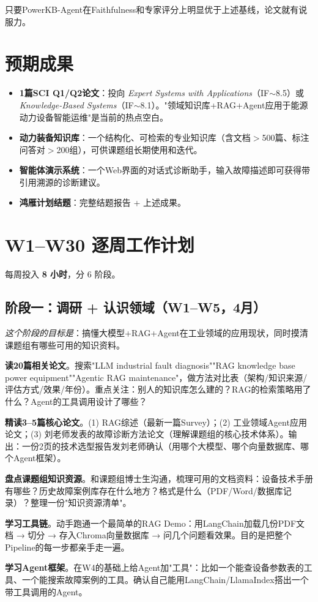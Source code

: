 \documentclass[a4paper, 11pt]{ctexart}
\begin{document}
只要PowerKB-Agent在Faithfulness和专家评分上明显优于上述基线，论文就有说服力。


\section{预期成果}
\begin{itemize}
    \item \textbf{1篇SCI Q1/Q2论文}：投向 \textit{Expert Systems with Applications}（IF$\sim$8.5）或 \textit{Knowledge-Based Systems}（IF$\sim$8.1）。"领域知识库+RAG+Agent应用于能源动力设备智能运维"是当前的热点空白。
    \item \textbf{动力装备知识库}：一个结构化、可检索的专业知识库（含文档$>$500篇、标注问答对$>$200组），可供课题组长期使用和迭代。
    \item \textbf{智能体演示系统}：一个Web界面的对话式诊断助手，输入故障描述即可获得带引用溯源的诊断建议。
    \item \textbf{鸿雁计划结题}：完整结题报告 + 上述成果。
\end{itemize}


\section{W1--W30 逐周工作计划}

每周投入 \textbf{8 小时}，分 6 阶段。

\subsection{阶段一：调研 + 认识领域（W1--W5，4月）}

\noindent\textit{这个阶段的目标是}：搞懂大模型+RAG+Agent在工业领域的应用现状，同时摸清课题组有哪些可用的知识资料。

\begin{description}[style=nextline, leftmargin=1.2cm, labelwidth=1cm, font=\bfseries\color{tsinghua}]
\item[W1] \textbf{读20篇相关论文}。搜索"LLM industrial fault diagnosis""RAG knowledge base power equipment""Agentic RAG maintenance"，做方法对比表（架构/知识来源/评估方式/效果/年份）。重点关注：别人的知识库怎么建的？RAG的检索策略用了什么？Agent的工具调用设计了哪些？
\item[W2] \textbf{精读3--5篇核心论文}。(1) RAG综述（最新一篇Survey）；(2) 工业领域Agent应用论文；(3) 刘老师发表的故障诊断方法论文（理解课题组的核心技术体系）。输出：一份2页的技术选型报告发刘老师确认（用哪个大模型、哪个向量数据库、哪个Agent框架）。
\item[W3] \textbf{盘点课题组知识资源}。和课题组博士生沟通，梳理可用的文档资料：设备技术手册有哪些？历史故障案例库存在什么地方？格式是什么（PDF/Word/数据库记录）？整理一份"知识资源清单"。
\item[W4] \textbf{学习工具链}。动手跑通一个最简单的RAG Demo：用LangChain加载几份PDF文档 → 切分 → 存入Chroma向量数据库 → 问几个问题看效果。目的是把整个Pipeline的每一步都亲手走一遍。
\item[W5] \textbf{学习Agent框架}。在W4的基础上给Agent加"工具"：比如一个能查设备参数表的工具、一个能搜索故障案例的工具。确认自己能用LangChain/LlamaIndex搭出一个带工具调用的Agent。
\end{description}
\end{document}
